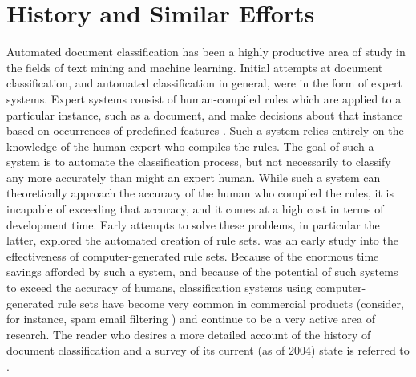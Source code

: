 \documentclass[main.tex]{subfiles}
\begin{document}
\section{History and Similar Efforts}

Automated document classification has been a highly productive area of study in the fields of text mining and machine learning. Initial attempts at document classification, and automated classification in general, were in the form of expert systems. Expert systems consist of human-compiled rules which are applied to a particular instance, such as a document, and make decisions about that instance based on occurrences of predefined features \citep{clifford:1983}. Such a system relies entirely on the knowledge of the human expert who compiles the rules. The goal of such a system is to automate the classification process, but not necessarily to classify any more accurately than might an expert human. While such a system can theoretically approach the accuracy of the human who compiled the rules, it is incapable of exceeding that accuracy, and it comes at a high cost in terms of development time. Early attempts to solve these problems, in particular the latter, explored the automated creation of rule sets. \citet{apte:1994} was an early study into the effectiveness of computer-generated rule sets. Because of the enormous time savings afforded by such a system, and because of the potential of such systems to exceed the accuracy of humans, classification systems using computer-generated rule sets have become very common in commercial products (consider, for instance, spam email filtering \citep{cormack:2008}) and continue to be a very active area of research. The reader who desires a more detailed account of the history of document classification and a survey of its current (as of 2004) state is referred to \citet{berry:2004}.
\end{document}
